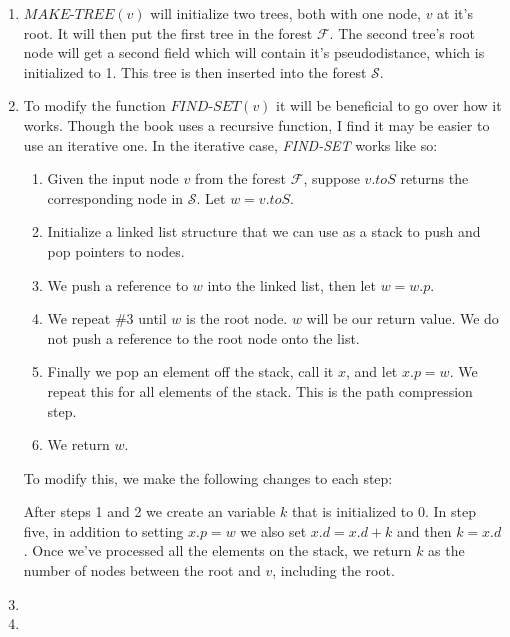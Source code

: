 \documentclass[letterpaper,10pt]{article}
\begin{document}
\begin{enumerate}
\begin{enumerate}
    \item $\textit{MAKE-TREE}(v)$ will initialize two trees, both with one node, $v$ at it's root. It will then put the first tree in the forest $\mathcal{F}$. The second tree's root node will get a second field which will contain it's pseudodistance, which is initialized to 1. This tree is then inserted into the forest $\mathcal{S}$.
    \item To modify the function $\textit{FIND-SET}(v)$ it will be beneficial to go over how it works. Though the book uses a recursive function, I find it may be easier to use an iterative one. In the iterative case, \textit{FIND-SET} works like so:
    \begin{enumerate}[1.]
      \item Given the input node $v$ from the forest $\mathcal{F}$, suppose $v.toS$ returns the corresponding node in $\mathcal{S}$. Let $w = v.toS$. 
      \item Initialize a linked list structure that we can use as a stack to push and pop pointers to nodes. 
      \item We push a reference to $w$ into the linked list, then let $w = w.p$.
      \item We repeat \#3 until $w$ is the root node. $w$ will be our return value. We do not push a reference to the root node onto the list.
      \item Finally we pop an element off the stack, call it $x$, and let $x.p = w$. We repeat this for all elements of the stack. This is the path compression step.
      \item We return $w$.
    \end{enumerate}
    To modify this, we make the following changes to each step:

    After steps 1 and 2 we create an variable $k$ that is initialized to 0.  In step five, in addition to setting $x.p = w$ we also set $x.d = x.d + k$ and then $k = x.d$. Once we've processed all the elements on the stack, we return $k$ as the number of nodes between the root and $v$, including the root.
    \item 
    \item 
  \end{enumerate}
\end{enumerate}
\end{document}
